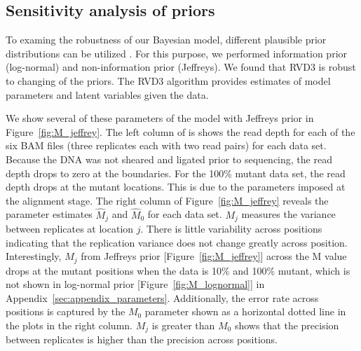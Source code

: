 \documentclass{bioinfo}
\begin{document}
\subsection{Sensitivity analysis of priors}
To examing the robustness of our Bayesian model, different plausible prior distributions can be utilized \citep{gelman2006prior}.
For this purpose, we performed information prior (log-normal) and non-information prior (Jeffreys).
We found that RVD3 is robust to changing of the priors. The RVD3 algorithm provides estimates of model parameters and latent variables given the data.

We show several of these parameters of the model with Jeffreys prior in Figure~\ref{fig:M_jeffrey}.
The left column of is shows the read depth for each of the six BAM files (three replicates each with two read pairs) for each data set.
Because the DNA was not sheared and ligated prior to sequencing, the read depth drops to zero at the boundaries. For the 100\% mutant data set, the read depth drops at the mutant locations.
This is due to the parameters imposed at the alignment stage.
The right column of Figure~\ref{fig:M_jeffrey} reveals the parameter estimates $\hat{M}_j$ and $\hat{M}_0$ for each data set. $M_j$ measures the variance between replicates at location $j$.
There is little variability across positions indicating that the replication variance does not change greatly across position.
Interestingly, $M_j$ from Jeffreys prior [Figure~\ref{fig:M_jeffrey}] across the M value drops at the mutant positions when the data is 10\% and 100\% mutant, which is not shown in log-normal prior [Figure~\ref{fig:M_lognormal}] in Appendix~\ref{sec:appendix_parameters}.
Additionally, the error rate across positions is captured by the $M_0$ parameter shown as a horizontal dotted line in the plots in the right column.
$M_j$ is greater than $M_0$ shows that the precision between replicates is higher than the precision across positions.
\end{document}

